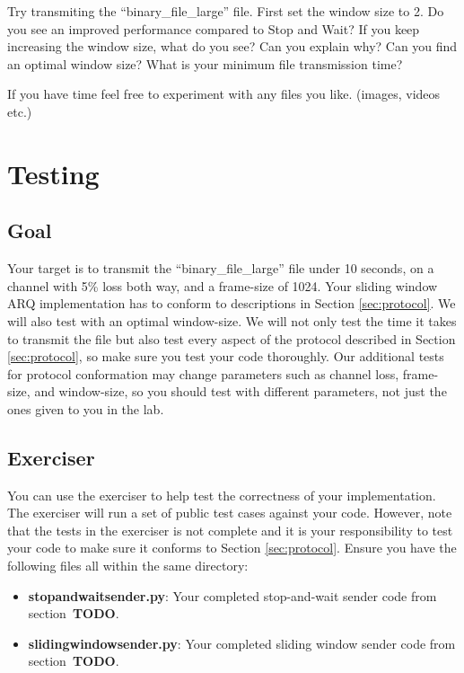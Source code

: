 \documentclass[11pt]{article}
\begin{document}
Try transmiting the ``binary\_file\_large'' file. First set the window size to 2. Do you see an improved performance compared to Stop and Wait? If you keep increasing the window size, what do you see? Can you explain why? Can you find an optimal window size? What is your minimum file transmission time?

If you have time feel free to experiment with any files you like. (images, videos etc.)


\section{Testing}
\subsection{Goal}
Your target is to transmit the ``binary\_file\_large'' file under 10 seconds, on a channel with 5\% loss both way, and a frame-size of 1024. Your sliding window ARQ implementation has to conform to descriptions in Section \ref{sec:protocol}. We will also test with an optimal window-size. We will not only test the time it takes to transmit the file but also test every aspect of the protocol described in Section \ref{sec:protocol}, so make sure you test your code thoroughly. Our additional tests for protocol conformation may change parameters such as channel loss, frame-size, and window-size, so you should test with different parameters, not just the ones given to you in the lab.

\subsection{Exerciser}
\label{sec:exercise}
You can use the exerciser to help test the correctness of your implementation. The exerciser will run a set of public test cases against your code. However, note that the tests in the exerciser is not complete and it is your responsibility to test your code to make sure it conforms to Section \ref{sec:protocol}. 
Ensure you have the following files all within the same directory:
\begin{itemize}
    \item \textbf{stopandwaitsender.py}: Your completed stop-and-wait sender code from section~\textbf{TODO}.
    \item \textbf{slidingwindowsender.py}: Your completed sliding window sender code from section~\textbf{TODO}.
\end{itemize}
\end{document}
